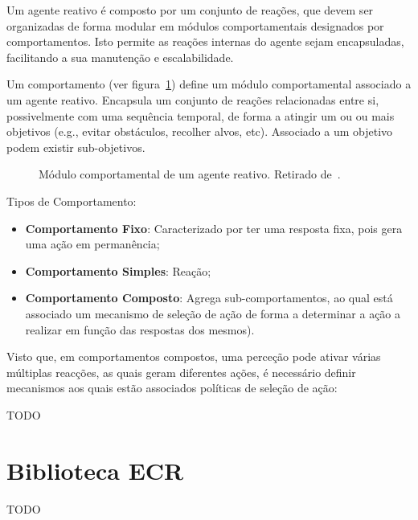 Um agente reativo é composto por um conjunto de reações, que devem ser organizadas de forma modular em módulos comportamentais designados por comportamentos.
Isto permite as reações internas do agente sejam encapsuladas, facilitando a sua manutenção e escalabilidade.

Um comportamento (ver figura~\ref{fig:agente-reativo-comportamento}) define um módulo comportamental associado a um agente reativo. Encapsula um conjunto de reações relacionadas entre si, possivelmente com uma sequência temporal, de forma a atingir um ou ou mais objetivos (e.g., evitar obstáculos, recolher alvos, etc). Associado a um objetivo podem existir sub-objetivos.

\begin{figure}[H]
    \label{fig:agente-reativo-comportamento}
    \begin{center}
    \end{center}
    \caption{Módulo comportamental de um agente reativo.
    Retirado de~\cite{isel:iasa:slides:arq-agentes-reativos-parte-1}.}
\end{figure}

Tipos de Comportamento:

\begin{itemize}
    \item \textbf{Comportamento Fixo}: Caracterizado por ter uma resposta fixa, pois gera uma ação em permanência;
    \item \textbf{Comportamento Simples}: Reação;
    \item \textbf{Comportamento Composto}: Agrega sub-comportamentos, ao qual está associado um mecanismo de seleção de ação de forma a determinar a ação a realizar em função das respostas dos mesmos).
\end{itemize}

Visto que, em comportamentos compostos, uma perceção pode ativar várias múltiplas reacções, as quais geram diferentes ações, é necessário definir mecanismos aos quais estão associados políticas de seleção de ação:

    TODO

\section{Biblioteca ECR}\label{sec:biblioteca-ecr}

TODO
